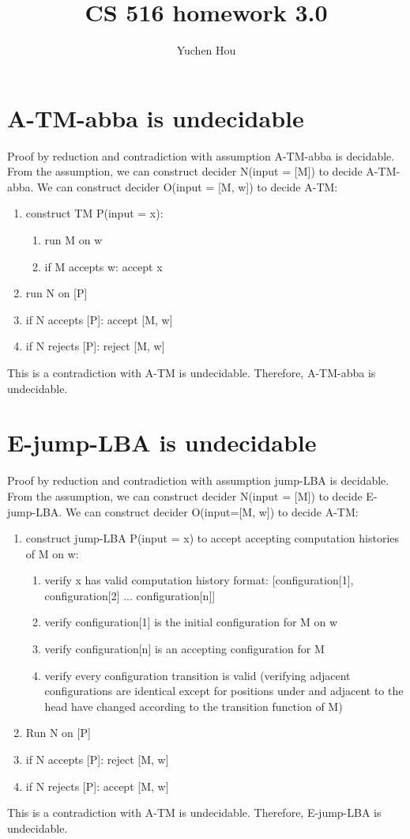 \documentclass{article}
\begin{document}
\lstset{language=python, tabsize=4}
\title{CS 516 homework 3.0}
\author{Yuchen Hou}
\maketitle


\section{A-TM-abba is undecidable}
Proof by reduction and contradiction with assumption A-TM-abba is decidable. From the assumption, we can construct decider N(input = [M]) to decide A-TM-abba. We can construct decider O(input = [M, w]) to decide A-TM:
\begin{enumerate}
	\item construct TM P(input = x):
	\begin{enumerate}
		\item run M on w
		\item if M accepts w: accept x
	\end{enumerate}
	\item run N on [P]
	\item if N accepts [P]: accept [M, w]
	\item if N rejects [P]: reject [M, w]
\end{enumerate}
This is a contradiction with A-TM is undecidable. Therefore, A-TM-abba is undecidable.

\section{E-jump-LBA is undecidable}
Proof by reduction and contradiction with assumption jump-LBA is decidable. From the assumption, we can construct decider N(input = [M]) to decide E-jump-LBA. We can construct decider O(input=[M, w]) to decide A-TM:
\begin{enumerate}
	\item construct jump-LBA P(input = x) to accept accepting computation histories of M on w:
	\begin{enumerate}
		\item verify x has valid computation history format: [configuration[1], configuration[2] ... configuration[n]]
		\item verify configuration[1] is the initial configuration for M on w
		\item verify configuration[n] is an accepting configuration for M
		\item verify every configuration transition is valid (verifying adjacent configurations are identical except for positions under and adjacent to the head have changed according to the transition function of M)
	\end{enumerate}
	\item Run N on [P]
	\item if N accepts [P]: reject [M, w]
	\item if N rejects [P]: accept [M, w]
\end{enumerate}
This is a contradiction with A-TM is undecidable. Therefore, E-jump-LBA is undecidable.
\end{document}
